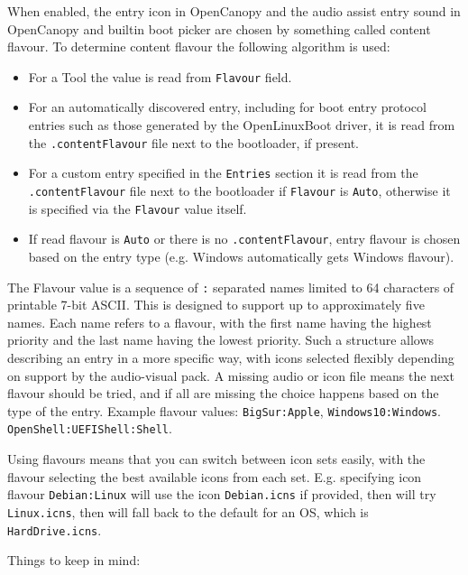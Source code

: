 \documentclass[]{article}
\providecommand{\tightlist}{%
  \setlength{\itemsep}{0pt}\setlength{\parskip}{0pt}}
\begin{document}
\begin{enumerate}
\begin{itemize}
  When enabled, the entry icon in OpenCanopy and the audio assist entry sound in OpenCanopy
  and builtin boot picker are chosen by something called content flavour. To determine
  content flavour the following algorithm is used:

    \begin{itemize}
    \tightlist
      \item For a Tool the value is read from \texttt{Flavour} field.
      \item For an automatically discovered entry, including for boot entry protocol entries such as those
      generated by the OpenLinuxBoot driver, it is read from the \texttt{.contentFlavour}
      file next to the bootloader, if present.
      \item For a custom entry specified in the \texttt{Entries} section it is read from the \texttt{.contentFlavour} file next to the
      bootloader if \texttt{Flavour} is \texttt{Auto}, otherwise it is specified via the \texttt{Flavour}
      value itself.
      \item If read flavour is \texttt{Auto} or there is no \texttt{.contentFlavour}, entry
      flavour is chosen based on the entry type (e.g. Windows automatically gets Windows flavour).
    \end{itemize}
    \medskip

  The Flavour value is a sequence of \texttt{:} separated names limited to 64 characters of
  printable 7-bit ASCII. This is designed to support up to approximately five names. Each name
  refers to a flavour, with the first name having the highest priority and the last name having
  the lowest priority. Such a structure allows describing an entry in a more specific way, with
  icons selected flexibly depending on support by the audio-visual pack. A missing audio or icon
  file means the next flavour should be tried, and if all are missing the choice happens based
  on the type of the entry.
  Example flavour values: \texttt{BigSur:Apple}, \texttt{Windows10:Windows}. \texttt{OpenShell:UEFIShell:Shell}.
  \medskip

  Using flavours means that you can switch between icon sets easily, with the flavour selecting
  the best available icons from each set. E.g. specifying icon flavour \texttt{Debian:Linux}
  will use the icon \texttt{Debian.icns} if provided, then will try \texttt{Linux.icns}, then will
  fall back to the default for an OS, which is \texttt{HardDrive.icns}.
  \medskip

  Things to keep in mind:


\end{itemize}
\end{enumerate}
\end{document}
